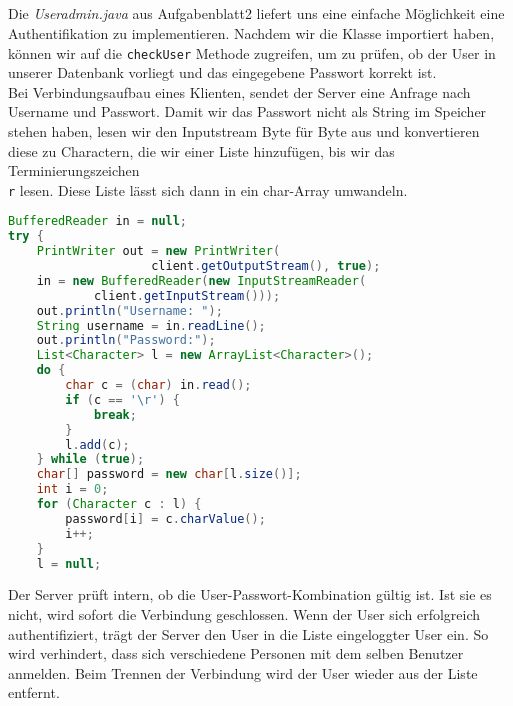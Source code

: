 \documentclass{scrartcl}
\begin{document}
    \subsection{}
    \label{sub:5.4}
      Die \textit{Useradmin.java} aus Aufgabenblatt2 liefert uns eine einfache
      Möglichkeit eine Authentifikation zu implementieren. Nachdem wir die
      Klasse importiert haben, können wir auf die \texttt{checkUser} Methode
      zugreifen, um zu prüfen, ob der User in unserer Datenbank vorliegt und
      das eingegebene Passwort korrekt ist.\\
      Bei Verbindungsaufbau eines Klienten, sendet der Server eine Anfrage nach
      Username und Passwort. Damit wir das Passwort nicht als String im
      Speicher stehen haben, lesen wir den Inputstream Byte für Byte aus und
      konvertieren diese zu Charactern, die wir einer Liste hinzufügen, bis wir
      das Terminierungszeichen \texttt{\\r} lesen. Diese Liste lässt sich dann
      in ein char-Array umwandeln.
      \begin{lstlisting}[language=java]
BufferedReader in = null;
try {
	PrintWriter out = new PrintWriter(
                    client.getOutputStream(), true);
	in = new BufferedReader(new InputStreamReader(
			client.getInputStream()));
	out.println("Username: ");
	String username = in.readLine();
	out.println("Password:");
	List<Character> l = new ArrayList<Character>();
	do {
		char c = (char) in.read();
		if (c == '\r') {
			break;
		}
		l.add(c);
	} while (true);
	char[] password = new char[l.size()];
	int i = 0;
	for (Character c : l) {
		password[i] = c.charValue();
		i++;
	}
	l = null;
 \end{lstlisting}
      Der Server prüft intern, ob die User-Passwort-Kombination gültig ist.
      Ist sie es nicht, wird sofort die Verbindung geschlossen. Wenn der User
      sich erfolgreich authentifiziert, trägt der Server den User in die Liste
      eingeloggter User ein. So wird verhindert, dass sich verschiedene Personen
      mit dem selben Benutzer anmelden. Beim Trennen der Verbindung wird der
      User wieder aus der Liste entfernt.
      \newpage
\end{document}
